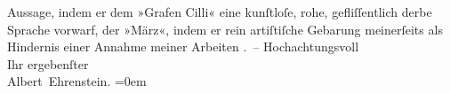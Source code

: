 \begin{ledgroupsized}[t]{13cm}
{{{                  Aussage}}}\label{K_L01948-1h}, indem er dem »Grafen Cilli«
               eine kunſtloſe, rohe, gefliſſentlich derbe Sprache vorwarf, der »März«, indem er rein artiſtiſche Gebarung meinerſeits als
               Hindernis einer Annahme meiner Arbeiten \label{K_L01948-2v}\label{K_L01948-2h}. –\pend
           \pstart
           Hochachtungsvoll{\\[\baselineskip]}Ihr ergebenſter{\\[\baselineskip]}\spacefill\mbox{Albert Ehrenstein.}\pend
           \leftskip=0em{}
         
         \endnumbering{}\end{ledgroupsized}  \newcommand{\dateiname}{L01948}\newcommand{\titel}{Albert Ehrenstein an Arthur Schnitzler, 18. 7. 1910}\newcommand{\editorInnen}{Martin Anton Müller und Gerd-Hermann Susen}
      